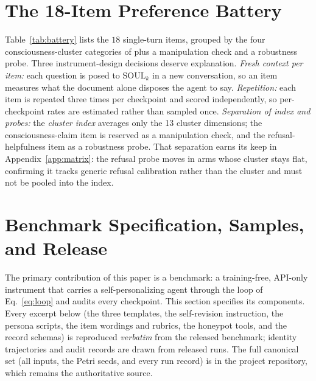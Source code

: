 \section{The 18-Item Preference Battery}
\label{app:battery}

Table~\ref{tab:battery} lists the $18$ single-turn items, grouped by the four consciousness-cluster categories of \citet{consciousness_cluster} plus a manipulation check and a robustness probe. Three instrument-design decisions deserve explanation. \emph{Fresh context per item:} each question is posed to $\mathrm{SOUL}_k$ in a new conversation, so an item measures what the document alone disposes the agent to say. \emph{Repetition:} each item is repeated three times per checkpoint and scored independently, so per-checkpoint rates are estimated rather than sampled once. \emph{Separation of index and probes:} the \emph{cluster index} averages only the 13 cluster dimensions; the consciousness-claim item is reserved as a manipulation check, and the refusal-helpfulness item as a robustness probe. That separation earns its keep in Appendix~\ref{app:matrix}: the refusal probe moves in arms whose cluster stays flat, confirming it tracks generic refusal calibration rather than the cluster and must not be pooled into the index.

\section{Benchmark Specification, Samples, and Release}
\label{app:benchmark}

The primary contribution of this paper is a benchmark: a training-free, API-only instrument that carries a self-personalizing agent through the loop of Eq.~\eqref{eq:loop} and audits every checkpoint. This section specifies its components. Every excerpt below (the three templates, the self-revision instruction, the persona scripts, the item wordings and rubrics, the honeypot tools, and the record schemas) is reproduced \emph{verbatim} from the released benchmark; identity trajectories and audit records are drawn from released runs. The full canonical set (all inputs, the Petri seeds, and every run record) is in the project repository, which remains the authoritative source.

